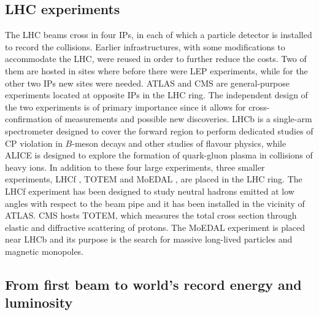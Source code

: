 \subsection{LHC experiments}

The LHC beams cross in four IPs, in each of which a particle detector is installed to record the collisions.  Earlier infrastructures, with some modifications to accommodate the LHC, were reused in order to further reduce the costs. Two of them are hosted in sites where before there were LEP experiments, while for the other two IPs new sites were needed. ATLAS \cite{ATLASjinst} and CMS \cite{CMS} are general-purpose experiments located at opposite IPs in the LHC ring. The independent design of the two experiments is of primary importance since it allows for cross-confirmation of measurements and possible new discoveries. LHCb \cite{LHCb} is a single-arm spectrometer designed to cover the forward region to perform dedicated studies of CP violation in $B$-meson decays and other studies of flavour physics, while ALICE \cite{ALICE} is designed to explore the formation of quark-gluon plasma in collisions of heavy ions. In addition to these four large experiments, three smaller experiments, LHCf \cite{LHCf}, TOTEM \cite{TOTEM} and MoEDAL \cite{MoEDAL}, are placed in the LHC ring. The LHCf experiment has been designed to study neutral hadrons emitted at low angles with respect to the beam pipe and it has been installed in the vicinity of ATLAS. CMS hosts TOTEM, which measures the total cross section through elastic and diffractive scattering of protons. The MoEDAL experiment is placed near LHCb and its purpose is the search for massive long-lived particles and magnetic monopoles.

\subsection{From first beam to world's record energy and luminosity}

